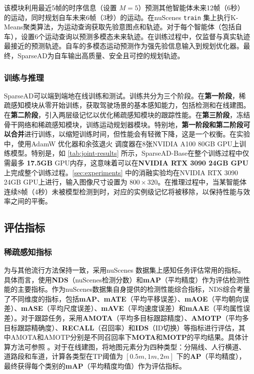 该模块利用最近5帧的时序信息（设置 $M=5$）预测其他智能体未来12帧（6秒）的运动，同时规划自车未来6帧（3秒）的运动。在nuScenes \texttt{train} 集上执行K-Means聚类算法，为运动查询获取先验意图点和轨迹。对于每个智能体（包括自车），设置6个运动查询以预测多模态未来轨迹。在训练过程中，仅监督与真实轨迹最接近的预测轨迹。自车的多模态运动预测作为强先验信息输入到规划优化器。最终，SparseAD为自车输出高质量、安全且可控的规划轨迹。

\subsubsection{训练与推理}
\label{sec:train_infer_detail}

SparseAD可以端到端地在线训练和测试。训练共分为三个阶段。在\textbf{第一阶段}，稀疏感知模块从零开始训练，获取驾驶场景的基本感知能力，包括检测和在线建图。在\textbf{第二阶段}，引入两层级记忆以优化稀疏感知模块的跟踪性能。在\textbf{第三阶段}，冻结骨干网络和稀疏感知模块，训练运动规划器模块。特别地，\textbf{第一阶段和第二阶段可以合并}进行训练，以缩短训练时间，但性能会有轻微下降，这是一个权衡。在实验中，使用AdamW\cite{loshchilov2017decoupled} 优化器和余弦退火\cite{loshchilov2016sgdr} 调度器在8张NVIDIA A100 80GB GPU上训练模型。特别是，如 \cref{tab:joint-results} 所示，SparseAD-Base在整个训练过程中仅需最多 \textbf{17.5GB} GPU内存，这意味着可以在\textbf{NVIDIA RTX 3090 24GB GPU}上完成整个训练过程。\cref{sec:experiments} 中的消融实验均在NVIDIA RTX 3090 24GB GPU上进行，输入图像尺寸设置为 $800\times320$。在推理过程中，当某智能体连续8帧（4秒）未被模型检测到时，对应的实例级记忆将被移除，以保持性能与效率之间的平衡。

\subsection{评估指标}
\subsubsection{稀疏感知指标}

为与其他流行方法保持一致，采用nuScenes \cite{caesar2020nuscenes} 数据集上感知任务评估常用的指标。具体而言，使用\textbf{NDS}（nuScenes检测分数）和\textbf{mAP}（平均精度）作为评估\model 检测性能的主要指标。作为nuScenes数据集自身提供的检测性能综合指标，NDS综合考量了不同维度的指标，包括\textbf{mAP}、\textbf{mATE}（平均平移误差）、\textbf{mAOE}（平均朝向误差）、\textbf{mASE}（平均尺度误差）、\textbf{mAVE}（平均速度误差）和\textbf{mAAE}（平均属性误差）。对于跟踪任务，采用\textbf{AMOTA}（平均多目标跟踪精度）、\textbf{AMOTP}（平均多目标跟踪精确度）、\textbf{RECALL}（召回率）和\textbf{IDS}（ID切换）等指标进行评估，其中AMOTA和AMOTP分别是不同召回率下\textbf{MOTA}和\textbf{MOTP}的平均结果。具体计算方法可参照 \cite{caesar2020nuscenes}。对于在线建图，将地图元素分为四种类型：分隔线、人行横道、道路段和车道，计算各类型在TP阈值为 $[0.5m, 1m, 2m]$ 下的\textbf{AP}（平均精度），最终获得每个类别的\textbf{mAP}（平均精度均值）作为评估指标。

